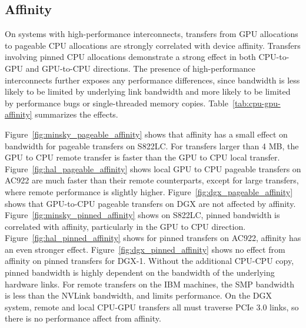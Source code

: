 \subsection{Affinity}
\label{sec:explicit-cpu-gpu-affinity}

On systems with high-performance interconnects, transfers from GPU allocations to pageable CPU allocations are strongly correlated with device affinity.
Transfers involving pinned CPU allocations demonstrate a strong effect in both CPU-to-GPU and GPU-to-CPU directions.
The presence of high-performance interconnects further exposes any performance differences, since bandwidth is less likely to be limited by underlying link bandwidth and more likely to be limited by performance bugs or single-threaded memory copies.
Table~\ref{tab:cpu-gpu-affinity} summarizes the effects.

Figure~\ref{fig:minsky_pageable_affinity} shows that affinity has a small effect on bandwidth for pageable transfers on S822LC.
For transfers larger than 4 MB, the GPU to CPU remote transfer is faster than the GPU to CPU local transfer.
Figure~\ref{fig:hal_pageable_affinity} shows local GPU to CPU pageable transfers on AC922 are much faster than their remote counterparts, except for large transfers, where remote performance is slightly higher.
Figure~\ref{fig:dgx_pageable_affinity} shows that GPU-to-CPU pageable transfers on DGX are not affected by affinity.
Figure~\ref{fig:minsky_pinned_affinity} shows on S822LC, pinned bandwidth is correlated with affinity, particularly in the GPU to CPU direction.
Figure~\ref{fig:hal_pinned_affinity} shows for pinned transfers on AC922, affinity has an even stronger effect.
Figure~\ref{fig:dgx_pinned_affinity} shows no effect from affinity on pinned transfers for DGX-1.
Without the additional CPU-CPU copy, pinned bandwidth is highly dependent on the bandwidth of the underlying hardware links.
For remote transfers on the IBM machines, the SMP bandwidth is less than the NVLink bandwidth, and limits performance.
On the DGX system, remote and local CPU-GPU transfers all must traverse PCIe 3.0 links, so there is no performance affect from affinity.

